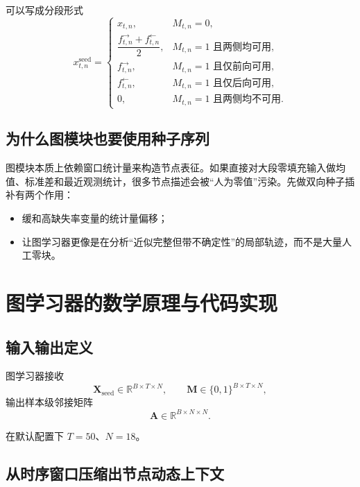 \documentclass[UTF8]{ctexart}
\begin{document}
可以写成分段形式
\begin{equation}
    x^{\text{seed}}_{t,n} =
    \begin{cases}
        x_{t,n}, & M_{t,n}=0, \\[4pt]
        \dfrac{f^{\rightarrow}_{t,n} + f^{\leftarrow}_{t,n}}{2}, & M_{t,n}=1 \text{ 且两侧均可用}, \\[8pt]
        f^{\rightarrow}_{t,n}, & M_{t,n}=1 \text{ 且仅前向可用}, \\[4pt]
        f^{\leftarrow}_{t,n}, & M_{t,n}=1 \text{ 且仅后向可用}, \\[4pt]
        0, & M_{t,n}=1 \text{ 且两侧均不可用}.
    \end{cases}
\end{equation}

\subsection{为什么图模块也要使用种子序列}

图模块本质上依赖窗口统计量来构造节点表征。如果直接对大段零填充输入做均值、标准差和最近观测统计，很多节点描述会被“人为零值”污染。先做双向种子插补有两个作用：
\begin{itemize}
    \item 缓和高缺失率变量的统计量偏移；
    \item 让图学习器更像是在分析“近似完整但带不确定性”的局部轨迹，而不是大量人工零块。
\end{itemize}

\section{图学习器的数学原理与代码实现}

\subsection{输入输出定义}

图学习器接收
\begin{equation}
    \bm{X}_{\text{seed}} \in \mathbb{R}^{B \times T \times N},
    \qquad
    \bm{M} \in \{0,1\}^{B \times T \times N},
\end{equation}
输出样本级邻接矩阵
\begin{equation}
    \bm{A} \in \mathbb{R}^{B \times N \times N}.
\end{equation}

在默认配置下 \(T=50\)、\(N=18\)。

\subsection{从时序窗口压缩出节点动态上下文}
\end{document}

